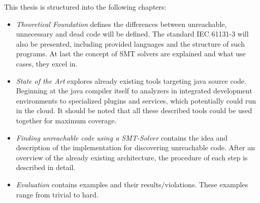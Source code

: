 This thesis is structured into the following chapters:
\begin{itemize}
	\item \emph{Theoretical Foundation} defines the differences between unreachable, unnecessary and dead code will be defined. The standard IEC 61131-3 will also be presented, including provided languages and the structure of such programs. At last the concept of SMT solvers are explained and what use cases, they excel in.
	\item \emph{State of the Art} explores already existing tools targeting java source code. Beginning at the java compiler itself to analyzers in integrated development environments to specialized plugins and services, which potentially could run in the cloud. It should be noted that all these described tools could be used together for maximum coverage.
	\item \emph{Finding unreachable code using a SMT-Solver} contains the idea and description of the implementation for discovering unreachable code. After an overview of the already existing architecture, the procedure of each step is described in detail.
	\item \emph{Evaluation} contains examples and their results/violations. These examples range from trivial to hard.
\end{itemize}
